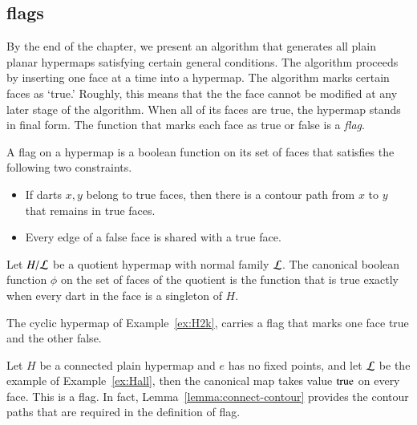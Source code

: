 \subsection{flags}

By the end of the chapter, we present an algorithm that
generates all plain planar hypermaps satisfying certain general
conditions.   The algorithm  proceeds by inserting one face
at a time into a hypermap.  
The algorithm  marks certain faces as `true.'
Roughly, this  means that the the face cannot be modified
at any later stage of the algorithm.   When all of its faces
are true, the hypermap stands in final form.
The function that marks each face as true or false is a
{\it flag}.


\begin{definition}  A flag on a hypermap
is a boolean function on its set of faces 
that satisfies the following two
constraints.
\begin{itemize}
    \item If darts $x,y$ belong to true faces,
    then there is a contour path from $x$ to $y$ that remains
    in true faces.
    \item Every edge of a false face is shared with a true face.
    \end{itemize}
\end{definition}

\begin{example} Let $H/{\cal L}$ be a quotient hypermap with
normal family $\cal L$.  The canonical boolean function
$\phi$ on the set of faces of the quotient is the function that
is true exactly when every dart in
the face is a singleton of $H$.
\end{example}

\begin{example} The cyclic hypermap of Example~\ref{ex:H2k}, 
carries a flag
that marks one face true and the other false.
\end{example}

\begin{example} Let 
$H$ be a connected plain hypermap and $e$ has no fixed points,
and let $\cal L$ be the example of Example~\ref{ex:Hall}, 
then the canonical
map takes value ${\operatorname{true}}$ on every face.  This is a flag.
In fact,
Lemma~\ref{lemma:connect-contour} provides the contour paths 
that are required in the definition of flag.
\end{example}

